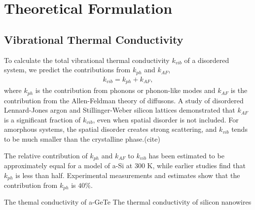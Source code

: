 \documentclass[aps,prb,twocolumn,superscriptaddress,footinbib,amsmath,amssymb,floatfix]{revtex4}
\begin{document}
\section{\label{S:Theory}Theoretical Formulation}

\subsection{\label{S:Theory:Thermal}Vibrational Thermal Conductivity}

To calculate the total vibrational thermal conductivity $k_{vib}$ of a 
disordered system, we predict 
the contributions from $k_{ph}$ and $k_{AF}$, 
\begin{equation}\label{EQ:kvib}
\begin{split}
k_{vib} = k_{ph} + k_{AF},
\end{split}
\end{equation}
where $k_{ph}$\cite{ashcroft} is the contribution from phonons or 
phonon-like modes and $k_{AF}$ is the contribution from the 
Allen-Feldman theory of diffusons.
\cite{feldman_thermal_1993,feldman_numerical_1999}
A study of disordered Lennard-Jones argon and Stillinger-Weber silicon 
lattices demonstrated that $k_{AF}$ is a significant fraction of $k_{vib}$, 
even when spatial disorder is not included. 
For amorphous systems, the 
spatial disorder creates strong scattering, and $k_{vib}$ tends to be 
much smaller than the crystalline phase.(cite)  

The relative contribution of $k_{ph}$ and $k_{AF}$ to $k_{vib}$ 
has been estimated 
to be approximately equal for a model of a-Si  
at 300 K,\cite{he_heat_2011} 
while earlier studies find that $k_{ph}$ is less than half.
\cite{feldman_thermal_1993,feldman_numerical_1999} Experimental 
measurements and estimates show that the contribution from 
$k_{ph}$ is $40\%$.\cite{liu_high_2009} 

The themal conductivity of a-GeTe \cite{sosso_thermal_2012}
The thermal conductivity of silicon nanowires \cite{donadio_atomistic_2009}
\end{document}
